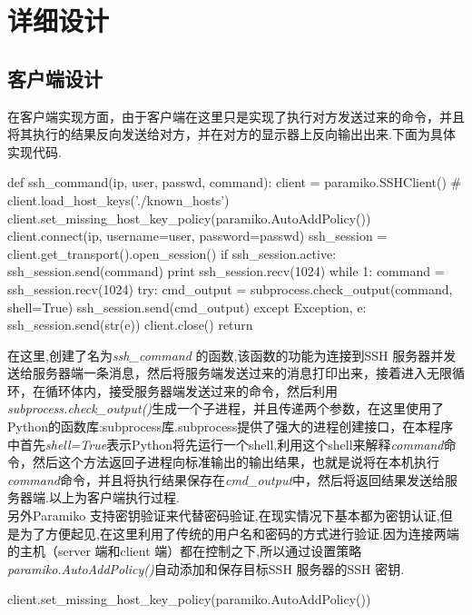 \documentclass[UTF8,nofonts,a4paper]{ctexart}
\begin{document}
\newpage
\newpage
\section{详细设计}
\subsection{客户端设计}
在客户端实现方面，由于客户端在这里只是实现了执行对方发送过来的命令，并且将其执行的结果反向发送给对方，并在对方的显示器上反向输出出来.下面为具体实现代码.
\begin{python}
def ssh_command(ip, user, passwd, command):
	client = paramiko.SSHClient()
	# client.load_host_keys('./known_hosts')
	client.set_missing_host_key_policy(paramiko.AutoAddPolicy())
	client.connect(ip, username=user, password=passwd)
	ssh_session = client.get_transport().open_session()
	if ssh_session.active:
		ssh_session.send(command)
		print ssh_session.recv(1024)
		while 1:
			command = ssh_session.recv(1024)
			try:
				cmd_output = subprocess.check_output(command, shell=True)
				ssh_session.send(cmd_output)
			except Exception, e:
				ssh_session.send(str(e))
		client.close()
	return
\end{python}

\indent 在这里,创建了名为\textit{ssh\_command} 的函数,该函数的功能为连接到SSH 服务器并发送给服务器端一条消息，然后将服务端发送过来的消息打印出来，接着进入无限循环，在循环体内，接受服务器端发送过来的命令，然后利用\textit{subprocess.check\_output()}生成一个子进程，并且传递两个参数，在这里使用了Python的函数库:subprocess库.subprocess提供了强大的进程创建接口，在本程序中首先\textit{shell=True}表示Python将先运行一个shell,利用这个shell来解释\textit{command}命令，然后这个方法返回子进程向标准输出的输出结果，也就是说将在本机执行\textit{command}命令，并且将执行结果保存在\textit{cmd\_output}中，然后将返回结果发送给服务器端.以上为客户端执行过程.\\
\indent 另外Paramiko 支持密钥验证来代替密码验证,在现实情况下基本都为密钥认证,但是为了方便起见,在这里利用了传统的用户名和密码的方式进行验证.因为连接两端的主机（server 端和client 端）都在控制之下,所以通过设置策略\textit{paramiko.AutoAddPolicy()}自动添加和保存目标SSH 服务器的SSH 密钥.
\begin{python}
client.set_missing_host_key_policy(paramiko.AutoAddPolicy())
\end{python}
\end{document}
